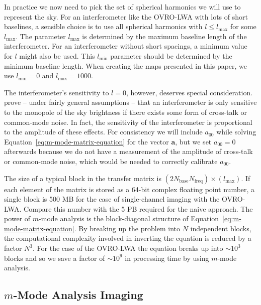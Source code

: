 \documentclass[twocolumn]{aastex61}
\renewcommand{\b}{\pmb}
\begin{document}
In practice we now need to pick the set of spherical harmonics we will use to represent the sky. For
an interferometer like the OVRO-LWA with lots of short baselines, a sensible choice is to use all
spherical harmonics with $l\le l_\text{max}$ for some $l_\text{max}$. The parameter $l_\text{max}$
is determined by the maximum baseline length of the interferometer.  For an interferometer without
short spacings, a minimum value for $l$ might also be used. This $l_\text{min}$ parameter should be
determined by the minimum baseline length.  When creating the maps presented in this paper, we use
$l_\text{min} = 0$ and $l_\text{max} = 1000$.

The interferometer's sensitivity to $l=0$, however, deserves special consideration.
\citet{2016ApJ...826..116V} prove -- under fairly general assumptions -- that an interferometer is
only sensitive to the monopole of the sky brightness if there exists some form of cross-talk or
common-mode noise. In fact, the sensitivity of the interferometer is proportional to the amplitude
of these effects. For consistency we will include $a_{00}$ while solving
Equation~\ref{eq:m-mode-matrix-equation} for the vector $\b a$, but we set $a_{00} = 0$ afterwards
because we do not have a measurement of the amplitude of cross-talk or common-mode noise, which
would be needed to correctly calibrate $a_{00}$.

The size of a typical block in the transfer matrix is
$(2N_\text{base}N_\text{freq})\times(l_\text{max})$. If each element of the matrix is stored as a
64-bit complex floating point number, a single block is 500 MB for the case of single-channel
imaging with the OVRO-LWA. Compare this number with the 5 PB required for the naive approach.  The
power of $m$-mode analysis is the block-diagonal structure of
Equation~\ref{eq:m-mode-matrix-equation}.  By breaking up the problem into $N$ independent blocks,
the computational complexity involved in inverting the equation is reduced by a factor $N^3$. For
the case of the OVRO-LWA the equation breaks up into $\sim10^3$ blocks and so we save a factor of
$\sim10^9$ in processing time by using $m$-mode analysis.

\subsection{$m$-Mode Analysis Imaging}
\end{document}
